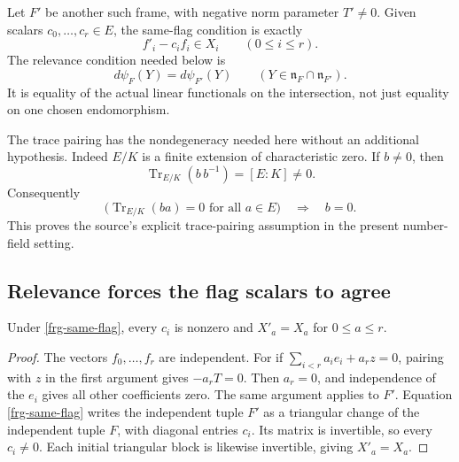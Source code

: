 Let $F'$ be another such frame, with negative norm parameter
$T'\ne0$. Given scalars $c_0,\ldots,c_r\in E$, the same-flag
condition is exactly
\begin{equation}\label{frg-same-flag}
                         f'_i-c_i f_i\in X_i
                                     \qquad(0\le i\le r).
\end{equation}
The relevance condition needed below is
\begin{equation}\label{frg-relevance}
 d\psi_F(Y)=d\psi_{F'}(Y)
                  \qquad(Y\in\mathfrak n_F\cap\mathfrak n_{F'}).
\end{equation}
It is equality of the actual linear functionals on the
intersection, not just equality on one chosen endomorphism.

The trace pairing has the nondegeneracy needed here without
an additional hypothesis. Indeed $E/K$ is a finite extension
of characteristic zero. If $b\ne0$, then
\[
 \operatorname{Tr}_{E/K}(b\,b^{-1})=[E:K]\ne0.
\]
Consequently
\begin{equation}\label{frg-trace-nondegenerate}
 \bigl(\operatorname{Tr}_{E/K}(ba)=0\text{ for all }a\in E\bigr)
                                      \quad\Longrightarrow\quad b=0.
\end{equation}
This proves the source's explicit trace-pairing assumption in
the present number-field setting.

\subsection{Relevance forces the flag scalars to agree}

\begin{lemma}\label{frg-triangular}
Under \eqref{frg-same-flag}, every $c_i$ is nonzero and
$X'_a=X_a$ for $0\le a\le r$.
\end{lemma}
\begin{proof}
The vectors $f_0,\ldots,f_r$ are independent. For if
$\sum_{i<r}a_i e_i+a_rz=0$, pairing with $z$ in the first
argument gives $-a_rT=0$. Then $a_r=0$, and independence
of the $e_i$ gives all other coefficients zero. The same
argument applies to $F'$.
Equation \eqref{frg-same-flag} writes the independent tuple
$F'$ as a triangular change of the independent tuple $F$,
with diagonal entries $c_i$. Its matrix is invertible,
so every $c_i\ne0$. Each initial triangular block is likewise
invertible, giving $X'_a=X_a$.
\end{proof}

